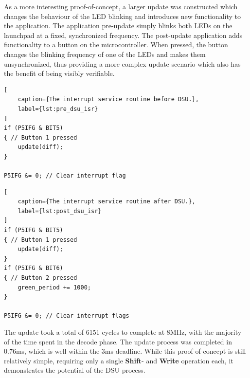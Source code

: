 As a more interesting proof-of-concept, a larger update was constructed which changes the behaviour of the LED blinking and introduces new functionality to the application. The application pre-update simply blinks both LEDs on the launchpad at a fixed, synchronized frequency. The post-update application adds functionality to a button on the microcontroller. When pressed, the button changes the blinking frequency of one of the LEDs and makes them unsynchronized, thus providing a more complex update scenario which also has the benefit of being visibly verifiable. 
\begin{framed}
\noindent\begin{minipage}{.45\textwidth}
\begin{lstlisting}[
    caption={The interrupt service routine before DSU.},
    label={lst:pre_dsu_isr}
]
if (P5IFG & BIT5)
{ // Button 1 pressed
    update(diff);
}

P5IFG &= 0; // Clear interrupt flag
\end{lstlisting}
\end{minipage}\hfill
\noindent\begin{minipage}{.45\textwidth}
\begin{lstlisting}[
    caption={The interrupt service routine after DSU.},
    label={lst:post_dsu_isr}
]
if (P5IFG & BIT5)
{ // Button 1 pressed
    update(diff);
} 
if (P5IFG & BIT6)
{ // Button 2 pressed
    green_period += 1000;
}

P5IFG &= 0; // Clear interrupt flags
\end{lstlisting}
\end{minipage}
\end{framed}\hfill

The update took a total of 6151 cycles to complete at 8MHz, with the majority of the time spent in the decode phase. The update process was completed in 0.76ms, which is well within the 3ms deadline. While this proof-of-concept is still relatively simple, requiring only a single \textbf{Shift}- and \textbf{Write} operation each, it demonstrates the potential of the DSU process. 

